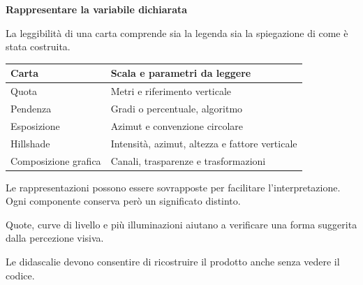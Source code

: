 \documentclass[12pt,aspectratio=1610]{beamer}
\newcommand{\PBody}[1]{\par{\fontsize{11.3}{14.8}\selectfont #1\par}}
\newcommand{\PSmall}[1]{\par{\fontsize{9.8}{13.1}\selectfont #1\par}}
\newcommand{\PInfo}[1]{%
\begin{tcolorbox}[enhanced,arc=1.6mm,boxrule=.55pt,colback=GeoTint,
 colframe=Rule!80!Classical,left=2.3mm,right=2.3mm,top=2mm,bottom=2mm,
 before skip=1mm,after skip=1mm]
\PSmall{#1}\end{tcolorbox}}
\begin{document}
\begin{frame}[plain]\hypertarget{slide75}{}
\begin{lrbox}{\TitleBox}
\begin{minipage}[t]{17.7cm}\raggedright\color{Ink}\fontsize{11.3}{14.8}\selectfont
\color{Navy}\bfseries\fontsize{20.6}{24.5}\selectfont Rappresentare la variabile dichiarata
\end{minipage}\end{lrbox}

\begin{lrbox}{\RecallBox}
\begin{minipage}[t]{14.3cm}\raggedright\color{Ink}\fontsize{11.3}{14.8}\selectfont
\fontsize{10.3}{13.8}\selectfont La leggibilità di una carta comprende sia la legenda sia la spiegazione di come è stata costruita.
\end{minipage}\end{lrbox}

\begin{lrbox}{\PilotLeftBox}
\begin{minipage}[t]{10.05cm}\raggedright\color{Ink}\fontsize{11.3}{14.8}\selectfont
{\fontsize{10.2}{13.1}\selectfont\renewcommand{\arraystretch}{1.45}\begin{tabular}{@{}p{3.5cm}p{5.5cm}@{}}\toprule
\textbf{Carta} & \textbf{Scala e parametri da leggere}\\\midrule
Quota & Metri e riferimento verticale\\
Pendenza & Gradi o percentuale, algoritmo\\
Esposizione & Azimut e convenzione circolare\\
Hillshade & Intensità, azimut, altezza e fattore verticale\\
Composizione grafica & Canali, trasparenze e trasformazioni\\
\bottomrule\end{tabular}}

\end{minipage}\end{lrbox}

\begin{lrbox}{\PilotRightBox}
\begin{minipage}[t]{7.55cm}\raggedright\color{Ink}\fontsize{11.3}{14.8}\selectfont
\PBody{Le rappresentazioni possono essere sovrapposte per facilitare l’interpretazione. Ogni componente conserva però un significato distinto.}
\vspace{2.5mm}
\PInfo{Quote, curve di livello e più illuminazioni aiutano a verificare una forma suggerita dalla percezione visiva.}
\PBody{Le didascalie devono consentire di ricostruire il prodotto anche senza vedere il codice.}
\vspace{2.5mm}


\end{minipage}
\end{lrbox}
\end{frame}
\end{document}

